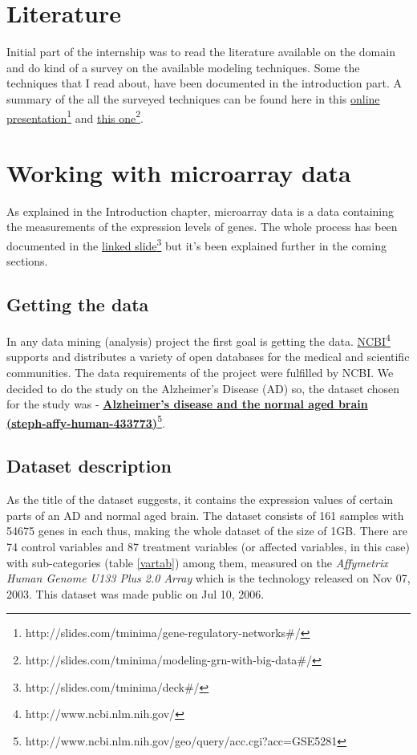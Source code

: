 \documentclass[oneside, a4paper, 11pt]{book}
\begin{document}
\section{Literature}
Initial part of the internship was to read the literature available on the domain and do kind of a survey on the available modeling techniques. Some the techniques that I read about, have been documented in the introduction part. A summary of the all the surveyed techniques can be found here in this \href{http://slides.com/tminima/gene-regulatory-networks\#/}{online presentation}\footnote{http://slides.com/tminima/gene-regulatory-networks\#/} and \href{http://slides.com/tminima/modeling-grn-with-big-data\#/}{this one}\footnote{http://slides.com/tminima/modeling-grn-with-big-data\#/}.

\section{Working with microarray data}
As explained in the Introduction chapter, microarray data is a data containing the measurements of the expression levels of genes. The whole process has been documented in the \href{http://slides.com/tminima/deck\#/}{linked slide}\footnote{http://slides.com/tminima/deck\#/} but it's been explained further in the coming sections.

\subsection{Getting the data}
In any data mining (analysis) project the first goal is getting the data. \href{http://www.ncbi.nlm.nih.gov/}{NCBI}\footnote{http://www.ncbi.nlm.nih.gov/} supports and distributes a variety of open databases for the medical and scientific communities. The data requirements of the project were fulfilled by NCBI. We decided to do the study on the Alzheimer's Disease (AD) so, the dataset chosen for the study was - \href{http://www.ncbi.nlm.nih.gov/geo/query/acc.cgi?acc=GSE5281}{\textbf{Alzheimer's disease and the normal aged brain (steph-affy-human-433773)}}\footnote{http://www.ncbi.nlm.nih.gov/geo/query/acc.cgi?acc=GSE5281}.

\subsection{Dataset description}
As the title of the dataset suggests, it contains the expression values of certain parts of an AD and normal aged brain.
The dataset consists of 161 samples with 54675 genes in each thus, making the whole dataset of the size of 1GB. There are 74 control variables and 87 treatment variables (or affected variables, in this case) with sub-categories (table \ref{vartab}) among them, measured on the \textit{Affymetrix Human Genome U133 Plus 2.0 Array} which is the technology released on Nov 07, 2003. This dataset was made public on Jul 10, 2006.
\end{document}
